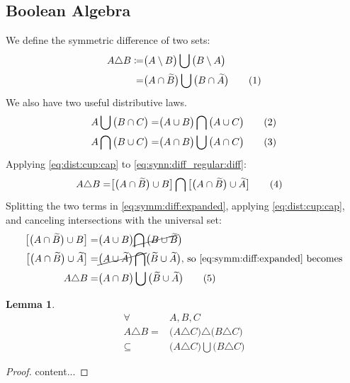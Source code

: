 \documentclass[]{article}
\newcommand\numberthis{\addtocounter{equation}{1}\tag{\theequation}}
\newcommand{\stcomp}[1]{\widetilde{#1}}
\newtheorem{lemma}[thm]{Lemma}
\begin{document}
\begin{appendices}
	\section{Boolean Algebra}
	We define the symmetric difference of two sets:
	\begin{align*}
		A \triangle B \coloneqq& \big(A \setminus B\big) \bigcup \big(B \setminus  A\big)\\
		=& \big(A \cap \stcomp{B}\big) \bigcup \big(B \cap \stcomp{A}\big) \numberthis \label{eq:synn:diff_regular:diff}\\
	\end{align*}
	We also have two useful distributive laws.
	\begin{align*}
		A \bigcup \big(B \cap C \big) =& \big(A \cup B\big) \bigcap  \big(A \cup C\big) \numberthis \label{eq:dist:cup:cap}\\
		A \bigcap \big(B \cup C \big) =& \big(A \cap B\big) \bigcup  \big(A \cap C\big)	\numberthis \label{eq:dist:cap:cup}	
	\end{align*}
	Applying \eqref{eq:dist:cup:cap} to \eqref{eq:synn:diff_regular:diff}:
	\begin{align*}
		A \triangle B =&\big[\big(A \cap \stcomp{B}\big) \cup B\big] \bigcap \big[ \big(A \cap \stcomp{B}\big) \cup \stcomp A \big] \numberthis \label{eq:symm:diff:expanded}
	\end{align*}
	Splitting the two terms in \eqref{eq:symm:diff:expanded}, applying \eqref{eq:dist:cup:cap}, and canceling intersections with the universal set:
	\begin{align*}
		\big[\big(A \cap \stcomp{B}\big) \cup B\big] =& \big(A \cup B\big) \cancel{\bigcap \big(B \cup \stcomp{B}}\big)\\
		\big[ \big(A \cap \stcomp{B}\big) \cup \stcomp A \big] =& \cancel{\big(A\cup\stcomp{A} \big) \bigcap} \big(\stcomp{B} \cup\stcomp{A}\big) \text{, so \eqref{eq:symm:diff:expanded} becomes}\\
		A \triangle B =& \big(A \cap B\big) \bigcup \big(\stcomp{B} \cup\stcomp{A}\big) \numberthis \label{eq:symm:diff:without:diff}
	\end{align*}

	\begin{lemma}
		\begin{align*}
			\forall& A,B,C\\
			A \triangle B =& \big(A\triangle C\big) \triangle \big(B\triangle C\big)\\
		    \subseteq& \big(A\triangle C\big) \bigcup \big(B\triangle C\big)
		\end{align*}
	\end{lemma}
	\begin{proof}
		content...
	\end{proof}
\end{appendices}

\printglossaries




\end{document}
